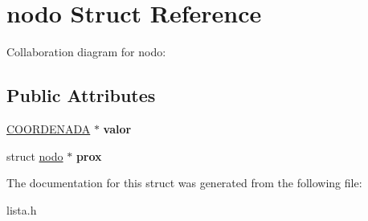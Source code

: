 \hypertarget{structnodo}{}\section{nodo Struct Reference}
\label{structnodo}


Collaboration diagram for nodo\+:
\subsection*{Public Attributes}
\begin{DoxyCompactItemize}
\item 
\mbox{\label{structnodo_a6be2ffb2aab6d0b8dae5ee3dbf211247}} 
\hyperlink{structCOORDENADA}{C\+O\+O\+R\+D\+E\+N\+A\+DA} $\ast$ {\bfseries valor}
\item 
\mbox{\label{structnodo_a086547621a7da23b916bbe26e0855308}} 
struct \hyperlink{structnodo}{nodo} $\ast$ {\bfseries prox}
\end{DoxyCompactItemize}


The documentation for this struct was generated from the following file\+:\begin{DoxyCompactItemize}
\item 
lista.\+h\end{DoxyCompactItemize}
